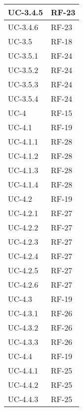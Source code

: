 \begin{longtable}{|>{\centering\arraybackslash}m{}|>{\centering\arraybackslash}m{}|}
	UC-3.4.5            & RF-23                   \\\hline
	UC-3.4.6            & RF-23                   \\\hline
	UC-3.5              & RF-18                   \\\hline
	UC-3.5.1            & RF-24                   \\\hline
	UC-3.5.2            & RF-24                   \\\hline
	UC-3.5.3            & RF-24                   \\\hline
	UC-3.5.4            & RF-24                   \\\hline
	UC-4                & RF-15                   \\\hline
	UC-4.1              & RF-19                   \\\hline
	UC-4.1.1            & RF-28                   \\\hline
	UC-4.1.2            & RF-28                   \\\hline
	UC-4.1.3            & RF-28                   \\\hline
	UC-4.1.4            & RF-28                   \\\hline
	UC-4.2              & RF-19                   \\\hline
	UC-4.2.1            & RF-27                   \\\hline
	UC-4.2.2            & RF-27                   \\\hline
	UC-4.2.3            & RF-27                   \\\hline
	UC-4.2.4            & RF-27                   \\\hline
	UC-4.2.5            & RF-27                   \\\hline
	UC-4.2.6            & RF-27                   \\\hline
	UC-4.3              & RF-19                   \\\hline
	UC-4.3.1            & RF-26                   \\\hline
	UC-4.3.2            & RF-26                   \\\hline
	UC-4.3.3            & RF-26                   \\\hline
	UC-4.4              & RF-19                   \\\hline
	UC-4.4.1            & RF-25                   \\\hline
	UC-4.4.2            & RF-25                   \\\hline
	UC-4.4.3            & RF-25                   \\\hline

\end{longtable}
